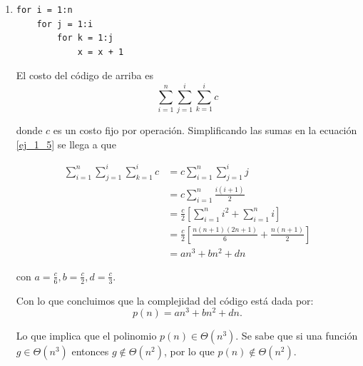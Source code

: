 \documentclass{article}
\begin{document}
\begin{enumerate}
    
    \item 
    \begin{verbatim}
for i = 1:n
    for j = 1:i
        for k = 1:j
            x = x + 1
    \end{verbatim}
    
    El costo del código de arriba es 
    \begin{equation}
    \label{ej_1_5}
    \sum_{i = 1}^n \sum_{j = 1}^i \sum_{k = 1}^i c    
    \end{equation}
    
    donde $c$ es un costo fijo por operación. Simplificando las sumas en la ecuación \ref{ej_1_5} se llega a que

    \begin{align}
        \sum_{i = 1}^n \sum_{j = 1}^i \sum_{k = 1}^i c &= 
        c \sum_{i = 1}^n \sum_{j = 1}^i j \\
        &=  c \sum_{i = 1}^n \frac{i(i + 1)}{2} \\
        &= \frac{c}{2} \left[ \sum_{i = 1}^n i^2 + \sum_{i = 1}^n i \right] \\
        &= \frac{c}{2} \left[ \frac{n(n + 1)(2n + 1)}{6} + \frac{n(n+1)}{2} \right] \\
        &= an^3 + bn^2 + dn
    \end{align}
    
    con $a = \frac{c}{6}, b = \frac{c}{2}, d = \frac{c}{3}$.
    
    
    Con lo que concluimos que la complejidad del código está dada por:
    \[ 
    p(n) = an^3 + bn^2 + dn.
    \]
    
    Lo que implica que el polinomio $p(n) \in \Theta(n^3)$. Se sabe que si una función $g \in \Theta(n^3)$ entonces $g \notin \Theta(n^2)$, por lo que $p(n) \notin \Theta(n^2)$.
    
\end{enumerate}
\end{document}
